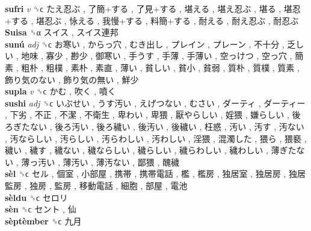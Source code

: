 \textbf{sufri} \emph{v}  ␝ϲ   たえ忍ぶ ,  了簡+する ,  了見+する ,  堪える ,  堪え忍ぶ ,  堪る ,  堪忍+する ,  堪忍ぶ ,  怺える ,  我慢+する ,  料簡+する ,  耐える ,  耐え忍ぶ ,  耐忍ぶ   \\
\textbf{Suisa} ␝α   スイス ,  スイス連邦   \\
\textbf{sunú} \emph{adj}  ␝ϲ   お寒い ,  からっ穴 ,  むき出し ,  プレイン ,  プレーン ,  不十分 ,  乏しい ,  地味 ,  寡少 ,  尠少 ,  御寒い ,  手うす ,  手薄 ,  手薄い ,  空っけつ ,  空っ穴 ,  簡素 ,  粗朴 ,  粗樸 ,  素朴 ,  素直 ,  薄い ,  貧しい ,  貧小 ,  貧弱 ,  質朴 ,  質樸 ,  質素 ,  飾り気のない ,  飾り気の無い ,  鮮少   \\
\textbf{supla} \emph{v}  ␝ϲ   かむ ,  吹く ,  噴く   \\
\textbf{sushi} \emph{adj}  ␝ϲ   いぶせい ,  うす汚い ,  えげつない ,  むさい ,  ダーティ ,  ダーティー ,  下劣 ,  不正 ,  不潔 ,  不衛生 ,  卑わい ,  卑猥 ,  厭やらしい ,  婬猥 ,  嫌らしい ,  後ろぎたない ,  後ろ汚い ,  後ろ穢い ,  後汚い ,  後穢い ,  枉惑 ,  汚い ,  汚す ,  汚ない ,  汚ならしい ,  汚らしい ,  汚らわしい ,  汚わしい ,  淫猥 ,  混濁した ,  猥ら ,  猥褻 ,  穢い ,  穢す ,  穢ない ,  穢ならしい ,  穢らしい ,  穢らわしい ,  穢わしい ,  薄ぎたない ,  薄っ汚い ,  薄汚い ,  薄汚ない ,  鄙猥 ,  醜穢   \\
\textbf{sèl} ␝ϲ   セル ,  個室 ,  小部屋 ,  携帯 ,  携帯電話 ,  檻 ,  檻房 ,  独居室 ,  独居房 ,  独居監房 ,  独房 ,  監房 ,  移動電話 ,  細胞 ,  部屋 ,  電池   \\
\textbf{sèldu} ␝ϲ   セロリ   \\
\textbf{sèn} ␝ϲ   セント ,  仙   \\
\textbf{sèptèmber} ␝ϲ   九月   \\
